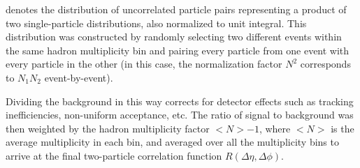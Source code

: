 denotes the distribution of uncorrelated particle pairs representing a product of two single-particle distributions, also normalized to unit integral. This distribution was constructed by randomly selecting two different events within the same hadron multiplicity bin and pairing every particle from one event with every particle in the other (in this case, the normalization factor $N^2$ corresponds to $N_1N_2$ event-by-event). 

Dividing the background in this way corrects for detector effects such as tracking inefficiencies, non-uniform acceptance, etc. The ratio of signal to background was then weighted by the hadron multiplicity factor $<N>-1$, where $<N>$ is the average multiplicity in each bin, and averaged over all the multiplicity bins to arrive at the final two-particle correlation function $R(\Delta\eta,\Delta\phi)$. 
